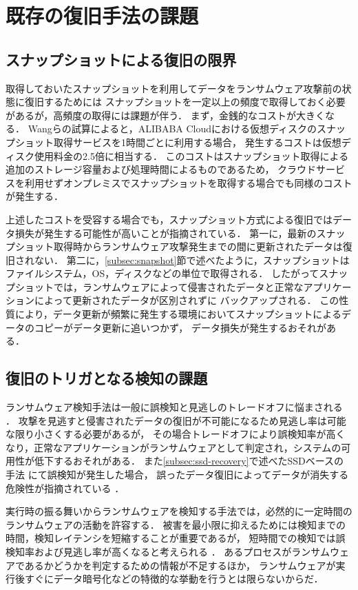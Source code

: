 \section{既存の復旧手法の課題}
\label{sec:recovery-challenges}
\subsection{スナップショットによる復旧の限界}
取得しておいたスナップショットを利用してデータをランサムウェア攻撃前の状態に復旧するためには
スナップショットを一定以上の頻度で取得しておく必要があるが，高頻度の取得には課題が伴う．
まず，金銭的なコストが大きくなる．
Wangら\cite{wang2024ransom}の試算によると，ALIBABA Cloudにおける仮想ディスクのスナップショット取得サービスを1時間ごとに利用する場合，
発生するコストは仮想ディスク使用料金の2.5倍に相当する．
このコストはスナップショット取得による追加のストレージ容量および処理時間によるものであるため，
クラウドサービスを利用せずオンプレミスでスナップショットを取得する場合でも同様のコストが発生する．

上述したコストを受容する場合でも，スナップショット方式による復旧ではデータ損失が発生する可能性が高いことが指摘されている\cite{wang2024ransom}．
第一に，最新のスナップショット取得時からランサムウェア攻撃発生までの間に更新されたデータは復旧されない．
第二に，\ref{subsec:snapshot}節で述べたように，スナップショットはファイルシステム，OS，ディスクなどの単位で取得される．
したがってスナップショットでは，ランサムウェアによって侵害されたデータと正常なアプリケーションによって更新されたデータが区別されずに
バックアップされる．
この性質により，データ更新が頻繁に発生する環境においてスナップショットによるデータのコピーがデータ更新に追いつかず，
データ損失が発生するおそれがある．

\subsection{復旧のトリガとなる検知の課題}
ランサムウェア検知手法は一般に誤検知と見逃しのトレードオフに悩まされる \cite{Evolution-Ransomware,berrueta2019survey, mitigation-modern}．
攻撃を見逃すと侵害されたデータの復旧が不可能になるため見逃し率は可能な限り小さくする必要があるが，
その場合トレードオフにより誤検知率が高くなり，正常なアプリケーションがランサムウェアとして判定され，システムの可用性が低下するおそれがある．
また\ref{subsec:ssd-recovery}で述べたSSDベースの手法 \cite{huang2017flashguard,baek2018ssd} にて誤検知が発生した場合，
誤ったデータ復旧によってデータが消失する危険性が指摘されている \cite{css2024-enomoto}．

実行時の振る舞いからランサムウェアを検知する手法では，必然的に一定時間のランサムウェアの活動を許容する．
被害を最小限に抑えるためには検知までの時間，検知レイテンシを短縮することが重要であるが，
短時間での検知では誤検知率および見逃し率が高くなると考えられる \cite{mitigation-modern}．
あるプロセスがランサムウェアであるかどうかを判定するための情報が不足するほか，
ランサムウェアが実行後すぐにデータ暗号化などの特徴的な挙動を行うとは限らないからだ．
